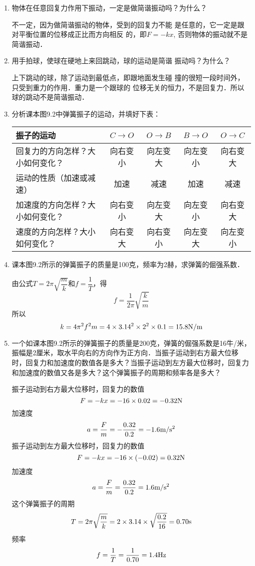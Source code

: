 \begin{enumerate}
    \item 物体在任意回复力作用下振动，一定是做简谐振动吗？为什么？


    \begin{solution}
        不一定，因为做简谐振动的物体，受到的回复力不能
        是任意的，它一定是跟对平衡位置的位移成正比而方向相反
        的，即$F=-kx$, 否则物体的振动就不是简谐振动．
    \end{solution}
    \item 用手拍球，使球在硬地上来回跳动，球的运动是简谐
    振动吗？为什么？


    \begin{solution}
        上下跳动的球，除了运动到最低点，即跟地面发生碰
        撞的很短一段时间外，只受到重力的作用．重力是一个跟球的
        位移无关的恒力，不是回复力．所以球的跳动不是简谐振动．
    \end{solution}
\item 分析课本图9.2中弹簧振子的运动，并填好下表：	
\begin{center}
    \begin{tabular}{p{}|c| c |c |c}
        \hline
        振子的运动  & $C\to O$ & $O\to B$ & $B\to O$ & $O\to C$\\
        \hline
        回复力的方向怎样？大小如何变化？&向右变小&向左变大&向左变小&向右变大\\
        运动的性质（加速或减速）&加速&减速&加速&减速\\
        加速度的方向怎样？大小如何变化？&向右变小&向左变大&向左变小&向右变大\\
        速度的方向怎样？大小如何变化？&向右变大&向右变小&向左变大&向左变小\\
        \hline
    \end{tabular}
\end{center}
	\item 课本图9.2所示的弹簧振子的质量是100克，频率为2赫，求弹簧的倔强系数．

\begin{solution}
由公式$T=2\pi\sqrt{\dfrac{m}{k}}$和$f=\dfrac{1}{T}$，得
\[f=\frac{1}{2\pi}\sqrt{\frac{k}{m}}\]
所以
\[k=4\pi^2 f^2m=4\times 3.14^2\times 2^2\times 0.1=15.8{\rm N/m}\]
    \end{solution}
    \item 一个如课本图9.2所示的弹簧振子的质量是200克，弹簧的倔强系数是16牛/米，振幅是2厘米，取水平向右的方向作为正方向．当振子运动到右方最大位移时，回复力和加速度的数值各是多大？当振子运动到左方最大位移时，回复力和加速度的数值又各是多大？这个弹簧振子的周期和频率各是多大？


    \begin{solution}
振子运动到右方最大位移时，回复力的数值
\[F=-kx=-16\times0.02=-0.32{\rm N}\]
加速度
\[a=\frac{F}{m}=-\frac{0.32}{0.2}=-1.6\text{m}/\text{s}^2\]
振子运动到左方最大位移时，回复力的数值
\[F=-kx=-16\times(-0.02)=0.32{\rm N}\]
加速度
\[a=\frac{F}{m}=\frac{0.32}{0.2}=1.6\text{m}/\text{s}^2\]
这个弹簧振子的周期
\[T=2\pi\sqrt{\frac{m}{k}}=2\times3.14\times\sqrt{\frac{0.2}{16}}=0.70{\rm s}\]
频率
\[f=\frac{1}{T}=\frac{1}{0.70}=1.4{\rm Hz}\]
    \end{solution}
\end{enumerate}


